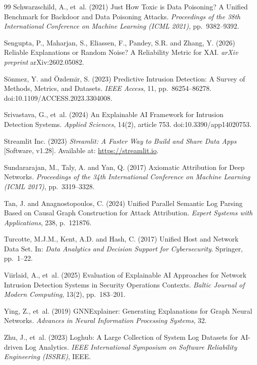 \documentclass[12pt,a4paper]{report}
\begin{document}
\begin{thebibliography}{99}
Schwarzschild, A., et~al. (2021) Just How Toxic is Data Poisoning? A Unified Benchmark for Backdoor and Data Poisoning Attacks. \textit{Proceedings of the 38th International Conference on Machine Learning (ICML 2021)}, pp.~9382--9392.

Sengupta, P., Maharjan, S., Eliassen, F., Pandey, S.R. and Zhang, Y. (2026) Reliable Explanations or Random Noise? A Reliability Metric for XAI. \textit{arXiv preprint} arXiv:2602.05082.

S\"{o}nmez, Y. and \"{O}zdemir, S. (2023) Predictive Intrusion Detection: A Survey of Methods, Metrics, and Datasets. \textit{IEEE Access}, 11, pp.~86254--86278. doi:10.1109/ACCESS.2023.3304008.

Srivastava, G., et~al. (2024) An Explainable AI Framework for Intrusion Detection Systems. \textit{Applied Sciences}, 14(2), article 753. doi:10.3390/app14020753.

Streamlit Inc. (2023) \textit{Streamlit: A Faster Way to Build and Share Data Apps} [Software, v1.28]. Available at: \url{https://streamlit.io}.

Sundararajan, M., Taly, A. and Yan, Q. (2017) Axiomatic Attribution for Deep Networks. \textit{Proceedings of the 34th International Conference on Machine Learning (ICML 2017)}, pp.~3319--3328.

Tan, J. and Anagnostopoulos, C. (2024) Unified Parallel Semantic Log Parsing Based on Causal Graph Construction for Attack Attribution. \textit{Expert Systems with Applications}, 238, p.~121876.

Turcotte, M.J.M., Kent, A.D. and Hash, C. (2017) Unified Host and Network Data Set. In: \textit{Data Analytics and Decision Support for Cybersecurity}. Springer, pp.~1--22.

Viirlaid, A., et~al. (2025) Evaluation of Explainable AI Approaches for Network Intrusion Detection Systems in Security Operations Contexts. \textit{Baltic Journal of Modern Computing}, 13(2), pp.~183--201.

Ying, Z., et~al. (2019) GNNExplainer: Generating Explanations for Graph Neural Networks. \textit{Advances in Neural Information Processing Systems}, 32.

Zhu, J., et~al. (2023) Loghub: A Large Collection of System Log Datasets for AI-driven Log Analytics. \textit{IEEE International Symposium on Software Reliability Engineering (ISSRE)}, IEEE.

\end{thebibliography}
\end{document}
